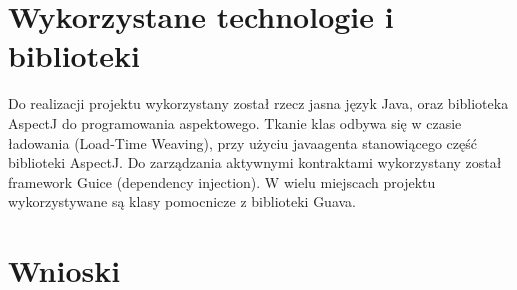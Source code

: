 \documentclass[12pt,a4paper,titlepage]{article}
\begin{document}

\section{Wykorzystane technologie i biblioteki}
Do realizacji projektu wykorzystany został rzecz jasna język Java, oraz biblioteka AspectJ do programowania aspektowego. Tkanie klas odbywa się w czasie ładowania (Load-Time Weaving), przy użyciu javaagenta stanowiącego część biblioteki AspectJ. Do zarządzania aktywnymi kontraktami wykorzystany został framework Guice (dependency injection). W wielu miejscach projektu wykorzystywane są klasy pomocnicze z biblioteki Guava.
\section{Wnioski}
\end{document}
